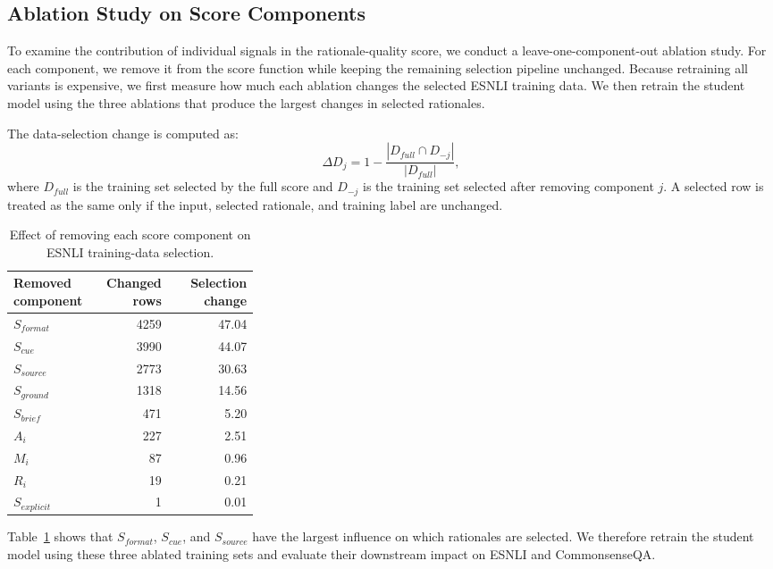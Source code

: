 \subsection{Ablation Study on Score Components}
\label{sec:score-component-ablation}

To examine the contribution of individual signals in the rationale-quality score, we conduct a leave-one-component-out ablation study. For each component, we remove it from the score function while keeping the remaining selection pipeline unchanged. Because retraining all variants is expensive, we first measure how much each ablation changes the selected ESNLI training data. We then retrain the student model using the three ablations that produce the largest changes in selected rationales.

The data-selection change is computed as:
\begin{equation}
    \Delta D_j =
    1 -
    \frac{|D_{full} \cap D_{-j}|}{|D_{full}|},
\end{equation}
where $D_{full}$ is the training set selected by the full score and $D_{-j}$ is the training set selected after removing component $j$. A selected row is treated as the same only if the input, selected rationale, and training label are unchanged.

\begin{table}[H]
\centering
\caption{Effect of removing each score component on ESNLI training-data selection.}
\label{tab:score-component-selection-change}
\begin{tabular}{p{0.32\linewidth} r r}
\hline
Removed component & Changed rows & Selection change \\
\hline
$S_{format}$ & 4259 & 47.04 \\
$S_{cue}$ & 3990 & 44.07 \\
$S_{source}$ & 2773 & 30.63 \\
$S_{ground}$ & 1318 & 14.56 \\
$S_{brief}$ & 471 & 5.20 \\
$A_i$ & 227 & 2.51 \\
$M_i$ & 87 & 0.96 \\
$R_i$ & 19 & 0.21 \\
$S_{explicit}$ & 1 & 0.01 \\
\hline
\end{tabular}
\end{table}

Table~\ref{tab:score-component-selection-change} shows that $S_{format}$, $S_{cue}$, and $S_{source}$ have the largest influence on which rationales are selected. We therefore retrain the student model using these three ablated training sets and evaluate their downstream impact on ESNLI and CommonsenseQA.

